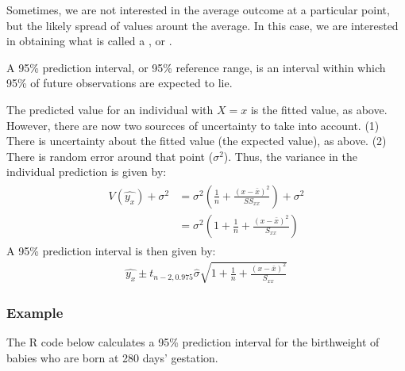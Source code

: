 \documentclass[letterpaper,10pt,english]{jupyterBook}
\begin{document}
\sphinxAtStartPar
Sometimes, we are not interested in the average outcome at a particular point, but the likely spread of values arount the average. In this case, we are interested in obtaining what is called a , or .

\sphinxAtStartPar
A 95\% prediction interval, or 95\% reference range, is an interval within which 95\% of future observations are expected to lie.

\sphinxAtStartPar
The predicted value for an individual with \(X=x\) is the fitted value, as above. However, there are now two sourcces of uncertainty to take into account. (1) There is uncertainty about the fitted value (the expected value), as above. (2) There is random error around that point (\(\sigma^2\)). Thus, the variance in the individual prediction is given by:
\begin{equation*}
\begin{split}
\begin{align*}
V(\hat{y_x}) + \sigma^2 &= \sigma^2 \left(\frac{1}{n}+\frac{(x-\bar{x})^2}{SS_{xx}}\right)+ \sigma^2 \\
 & = \sigma^2\left(1+\frac{1}{n}+\frac{(x-\bar{x})^2}{S_{xx}}\right)
\end{align*}
\end{split}
\end{equation*}
\sphinxAtStartPar
A 95\% prediction interval is then given by:
\begin{equation*}
\begin{split}
\hat{y_x} \pm t_{n-2, 0.975} \hat{\sigma} \sqrt{1+ \frac{1}{n}+ \frac{(x-\bar{x})^2}{S_{xx}}}
\end{split}
\end{equation*}

\subsubsection{Example}
\label{\detokenize{12.i. Linear Regression I:id1}}
\sphinxAtStartPar
The R code below calculates a 95\% prediction interval for the birthweight of babies who are born at 280 days’ gestation.
\end{document}
